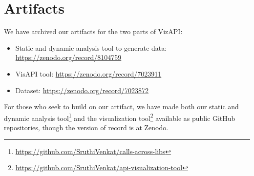 \section{Artifacts}
\label{sec:artifacts}
We have archived our artifacts for the two parts of VizAPI:
\begin{itemize}
\item Static and dynamic analysis tool to generate data: \url{https://zenodo.org/record/8104759}
\item VisAPI tool: \url{https://zenodo.org/record/7023911}
\item Dataset: \url{https://zenodo.org/record/7023872}
\end{itemize}
For those who seek to build on our artifact, we have made both
our static and dynamic analysis tool\footnote{\url{https://github.com/SruthiVenkat/calls-across-libs}}
and the visualization tool\footnote{\url{https://github.com/SruthiVenkat/api-visualization-tool}}
available as public GitHub repositories, though the version of record is at Zenodo.
